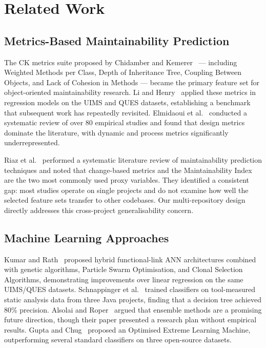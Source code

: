 \documentclass[11pt,a4paper]{article}
\begin{document}
\section{Related Work}
\label{sec:related}

\subsection{Metrics-Based Maintainability Prediction}

The CK metrics suite proposed by Chidamber and Kemerer~\cite{ck1994} --- including
Weighted Methods per Class, Depth of Inheritance Tree, Coupling Between Objects,
and Lack of Cohesion in Methods --- became the primary feature set for
object-oriented maintainability research. Li and Henry~\cite{liHenry1993} applied
these metrics in regression models on the UIMS and QUES datasets, establishing
a benchmark that subsequent work has repeatedly revisited. Elmidaoui
et al.~\cite{elmidaoui2019} conducted a systematic review of over 80 empirical
studies and found that design metrics dominate the literature, with dynamic and
process metrics significantly underrepresented.

Riaz et al.~\cite{riaz2009systematic} performed a systematic literature review
of maintainability prediction techniques and noted that change-based metrics
and the Maintainability Index are the two most commonly used proxy variables.
They identified a consistent gap: most studies operate on single projects and
do not examine how well the selected feature sets transfer to other codebases.
Our multi-repository design directly addresses this cross-project generalisability
concern.

\subsection{Machine Learning Approaches}

Kumar and Rath~\cite{kumarRath2015,kumarRath2016} proposed hybrid functional-link
ANN architectures combined with genetic algorithms, Particle Swarm Optimisation,
and Clonal Selection Algorithms, demonstrating improvements over linear regression
on the same UIMS/QUES datasets. Schnappinger et al.~\cite{schnappinger2019} trained
classifiers on tool-measured static analysis data from three Java projects, finding
that a decision tree achieved 80\% precision. Alsolai and Roper~\cite{alsolai2019application}
argued that ensemble methods are a promising future direction, though their paper
presented a research plan without empirical results. Gupta and Chug~\cite{gupta2021}
proposed an Optimised Extreme Learning Machine, outperforming several standard
classifiers on three open-source datasets.
\end{document}
